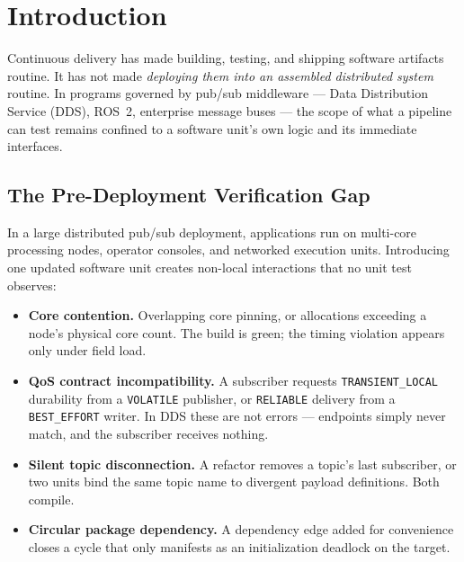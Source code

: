 \documentclass[sigconf,9pt]{acmart}
\begin{document}
\maketitle
\sloppy

\section{Introduction}
\label{sec:intro}

Continuous delivery has made building, testing, and shipping software artifacts routine. It has
not made \emph{deploying them into an assembled distributed system} routine. In programs governed
by pub/sub middleware --- Data Distribution Service (DDS), ROS~2, enterprise message buses --- the
scope of what a pipeline can test remains confined to a software unit's own logic and its
immediate interfaces.

\subsection{The Pre-Deployment Verification Gap}
\label{sec:gap}

In a large distributed pub/sub deployment, applications run on multi-core processing nodes,
operator consoles, and networked execution units. Introducing one updated software unit creates
non-local interactions that no unit test observes:

\begin{itemize}
\item \textbf{Core contention.} Overlapping core pinning, or allocations exceeding a node's
  physical core count. The build is green; the timing violation appears only under field load.
\item \textbf{QoS contract incompatibility.} A subscriber requests \texttt{TRANSIENT\_LOCAL}
  durability from a \texttt{VOLATILE} publisher, or \texttt{RELIABLE} delivery from a
  \texttt{BEST\_EFFORT} writer. In DDS these are not errors --- endpoints simply never match, and the
  subscriber receives nothing.
\item \textbf{Silent topic disconnection.} A refactor removes a topic's last subscriber, or two
  units bind the same topic name to divergent payload definitions. Both compile.
\item \textbf{Circular package dependency.} A dependency edge added for convenience closes a cycle
  that only manifests as an initialization deadlock on the target.
\end{itemize}
\end{document}
